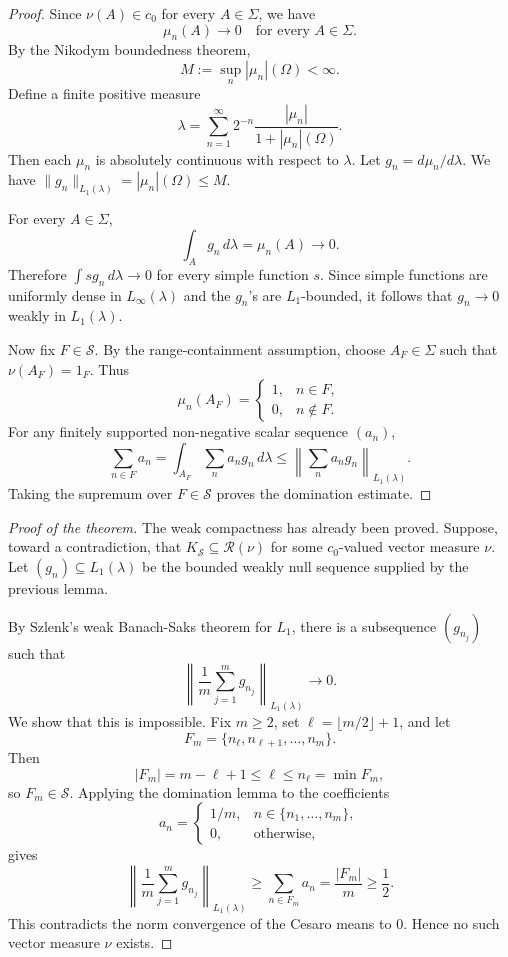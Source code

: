 \documentclass[11pt]{article}
\newcommand{\Sch}{\mathcal S}
\newcommand{\Range}{\mathcal R}
\begin{document}
\begin{proof}
Since \(\nu(A)\in c_0\) for every \(A\in\Sigma\), we have
\[
\mu_n(A)\to0\quad\text{for every }A\in\Sigma.
\]
By the Nikodym boundedness theorem,
\[
M:=\sup_n |\mu_n|(\Omega)<\infty.
\]
Define a finite positive measure
\[
\lambda=\sum_{n=1}^{\infty}2^{-n}\frac{|\mu_n|}{1+|\mu_n|(\Omega)}.
\]
Then each \(\mu_n\) is absolutely continuous with respect to \(\lambda\).
Let \(g_n=d\mu_n/d\lambda\). We have
\(\|g_n\|_{L_1(\lambda)}=|\mu_n|(\Omega)\le M\).

For every \(A\in\Sigma\),
\[
\int_A g_n\,d\lambda=\mu_n(A)\to0.
\]
Therefore \(\int s g_n\,d\lambda\to0\) for every simple function \(s\). Since
simple functions are uniformly dense in \(L_\infty(\lambda)\) and the
\(g_n\)'s are \(L_1\)-bounded, it follows that \(g_n\to0\) weakly in
\(L_1(\lambda)\).

Now fix \(F\in\Sch\). By the range-containment assumption, choose
\(A_F\in\Sigma\) such that \(\nu(A_F)=1_F\). Thus
\[
\mu_n(A_F)=
\begin{cases}
1,& n\in F,\\
0,& n\notin F.
\end{cases}
\]
For any finitely supported non-negative scalar sequence \((a_n)\),
\[
\sum_{n\in F}a_n
=\int_{A_F}\sum_n a_n g_n\,d\lambda
\le
\left\|\sum_n a_n g_n\right\|_{L_1(\lambda)}.
\]
Taking the supremum over \(F\in\Sch\) proves the domination estimate.
\end{proof}

\begin{proof}[Proof of the theorem]
The weak compactness has already been proved. Suppose, toward a contradiction,
that \(K_{\Sch}\subseteq\Range(\nu)\) for some \(c_0\)-valued vector measure
\(\nu\). Let \((g_n)\subseteq L_1(\lambda)\) be the bounded weakly null
sequence supplied by the previous lemma.

By Szlenk's weak Banach-Saks theorem for \(L_1\), there is a subsequence
\((g_{n_j})\) such that
\[
\left\|\frac1m\sum_{j=1}^m g_{n_j}\right\|_{L_1(\lambda)}\longrightarrow0.
\]
We show that this is impossible. Fix \(m\ge2\), set
\(\ell=\lfloor m/2\rfloor+1\), and let
\[
F_m=\{n_{\ell},n_{\ell+1},\dots,n_m\}.
\]
Then
\[
|F_m|=m-\ell+1\le \ell\le n_\ell=\min F_m,
\]
so \(F_m\in\Sch\). Applying the domination lemma to the coefficients
\[
a_n=
\begin{cases}
1/m,& n\in\{n_1,\dots,n_m\},\\
0,&\text{otherwise},
\end{cases}
\]
gives
\[
\left\|\frac1m\sum_{j=1}^m g_{n_j}\right\|_{L_1(\lambda)}
\ge
\sum_{n\in F_m}a_n
=\frac{|F_m|}{m}\ge\frac12.
\]
This contradicts the norm convergence of the Cesaro means to \(0\). Hence no
such vector measure \(\nu\) exists.
\end{proof}
\end{document}
